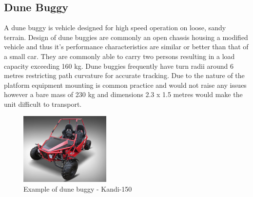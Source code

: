 \documentclass[main.tex]{subfiles}
\begin{document}
\subsection{Dune Buggy}
A dune buggy is vehicle designed for high speed operation on loose, sandy terrain. Design of dune buggies are commonly an open chassis housing a modified vehicle and thus it's performance characteristics are similar or better than that of a small car. They are commonly able to carry two persons resulting in a load capacity exceeding 160 kg. Dune buggies frequently have turn radii around 6 metres restricting path curvature for accurate tracking. Due to the nature of the platform equipment mounting is common practice and would not raise any issues however a bare mass of 230 kg and dimensions 2.3 x 1.5 metres would make the unit difficult to transport.
\begin{figure}[ht]
\includegraphics[width=0.4\textwidth]{4-ConceptDesign/kandidunebuggy.jpg}
\centering
\caption[Example of dune buggy - Kandi-150]{Example of dune buggy - Kandi-150 \parencite{150GKM}} 
\end{figure}
\end{document}
